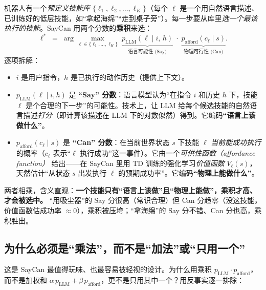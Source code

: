 机器人有一个\emph{预定义技能库} $\{\ell_1,\ell_2,\dots,\ell_K\}$（每个 $\ell$ 是一个用自然语言描述、已训练好的低层技能，如“拿起海绵”“走到桌子旁”）。每一步要从库里\emph{选一个最该执行的技能}。SayCan 用两个分数的\textbf{乘积}来选：
\begin{equation}
  \ell^{\ast}
  \;=\;
  \arg\max_{\ell \in \{\ell_1,\dots,\ell_K\}}
  \;
  \underbrace{p_{\text{LLM}}(\ell \mid i,\, h)}_{\text{语言可能性 (Say)}}
  \;\cdot\;
  \underbrace{p_{\text{afford}}(c_{\ell} \mid s)}_{\text{物理可行性 (Can)}}.
  \label{eq:saycan}
\end{equation}
逐项拆解：
\begin{itemize}
  \item $i$ 是用户指令，$h$ 是已执行的动作历史（提供上下文）。
  \item $p_{\text{LLM}}(\ell \mid i, h)$ 是 \textbf{“Say” 分数}：语言模型认为“在指令 $i$ 和历史 $h$ 下，技能 $\ell$ 是个合理的下一步”的可能性。技术上，让 LLM 给每个候选技能的自然语言描述\emph{打分}（即计算该描述在 LLM 下的对数似然）得到。它编码\textbf{“语言上该做什么”}。
  \item $p_{\text{afford}}(c_{\ell} \mid s)$ 是 \textbf{“Can” 分数}：在当前世界状态 $s$ 下技能 $\ell$ \emph{当前能成功执行}的概率（$c_\ell$ 表示“$\ell$ 执行成功”这一事件）。它由一个\emph{可供性函数（affordance function）} 给出——在 SayCan 里用 TD 训练的强化学习\emph{价值函数} $V_\ell(s)$，天然估计“从状态 $s$ 出发执行 $\ell$ 的预期成功率”。它编码\textbf{“物理上能做什么”}。
\end{itemize}

\noindent 两者相乘，含义直观：\textbf{一个技能只有“语言上该做”且“物理上能做”，乘积才高、才会被选中。} “用吸尘器”的 Say 分很高（常识合理）但 Can 分趋零（没这技能，价值函数估成功率 $\approx 0$），乘积被压垮；“拿海绵”的 Say 分不错、Can 分也高，乘积胜出。

\subsection{为什么必须是“乘法”，而不是“加法”或“只用一个”}
\label{sec:saycan-why-mult}

这是 SayCan 最值得玩味、也最容易被轻视的设计。为什么用乘积 $p_{\text{LLM}}\cdot p_{\text{afford}}$，而不是加权和 $\alpha\, p_{\text{LLM}} + \beta\, p_{\text{afford}}$，更不是只用其中一个？用反事实逐一排除：

